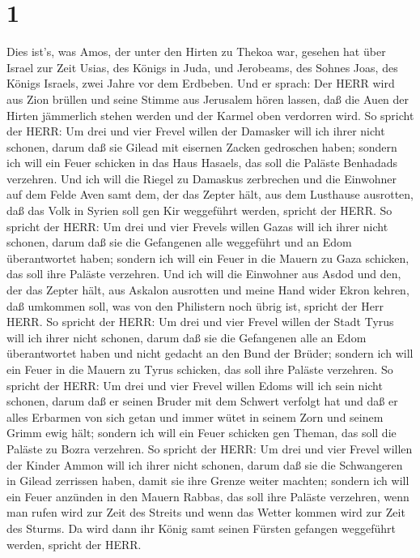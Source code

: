 \hypertarget{section}{%
\section{1}\label{section}}

 Dies ist's, was Amos, der unter den Hirten zu Thekoa war,
gesehen hat über Israel zur Zeit Usias, des Königs in Juda, und
Jerobeams, des Sohnes Joas, des Königs Israels, zwei Jahre vor dem
Erdbeben.  Und er sprach: Der HERR wird aus Zion brüllen und
seine Stimme aus Jerusalem hören lassen, daß die Auen der Hirten
jämmerlich stehen werden und der Karmel oben verdorren wird.
 So spricht der HERR: Um drei und vier Frevel willen der
Damasker will ich ihrer nicht schonen, darum daß sie Gilead mit eisernen
Zacken gedroschen haben;  sondern ich will ein Feuer
schicken in das Haus Hasaels, das soll die Paläste Benhadads verzehren.
 Und ich will die Riegel zu Damaskus zerbrechen und die
Einwohner auf dem Felde Aven samt dem, der das Zepter hält, aus dem
Lusthause ausrotten, daß das Volk in Syrien soll gen Kir weggeführt
werden, spricht der HERR.  So spricht der HERR: Um drei und
vier Frevels willen Gazas will ich ihrer nicht schonen, darum daß sie
die Gefangenen alle weggeführt und an Edom überantwortet haben;
 sondern ich will ein Feuer in die Mauern zu Gaza schicken,
das soll ihre Paläste verzehren.  Und ich will die Einwohner
aus Asdod und den, der das Zepter hält, aus Askalon ausrotten und meine
Hand wider Ekron kehren, daß umkommen soll, was von den Philistern noch
übrig ist, spricht der Herr HERR.  So spricht der HERR: Um
drei und vier Frevel willen der Stadt Tyrus will ich ihrer nicht
schonen, darum daß sie die Gefangenen alle an Edom überantwortet haben
und nicht gedacht an den Bund der Brüder;  sondern ich will
ein Feuer in die Mauern zu Tyrus schicken, das soll ihre Paläste
verzehren.  So spricht der HERR: Um drei und vier Frevel
willen Edoms will ich sein nicht schonen, darum daß er seinen Bruder mit
dem Schwert verfolgt hat und daß er alles Erbarmen von sich getan und
immer wütet in seinem Zorn und seinem Grimm ewig hält; 
sondern ich will ein Feuer schicken gen Theman, das soll die Paläste zu
Bozra verzehren.  So spricht der HERR: Um drei und vier
Frevel willen der Kinder Ammon will ich ihrer nicht schonen, darum daß
sie die Schwangeren in Gilead zerrissen haben, damit sie ihre Grenze
weiter machten;  sondern ich will ein Feuer anzünden in den
Mauern Rabbas, das soll ihre Paläste verzehren, wenn man rufen wird zur
Zeit des Streits und wenn das Wetter kommen wird zur Zeit des Sturms.
 Da wird dann ihr König samt seinen Fürsten gefangen
weggeführt werden, spricht der HERR.


